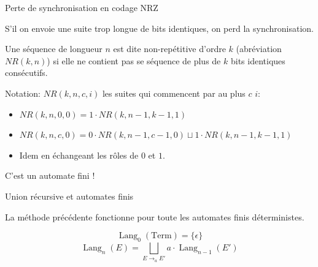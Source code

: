 \documentclass{beamer}
\begin{document}
\begin{frame}{Perte de synchronisation en codage NRZ}

  S'il on envoie une suite trop longue de bits identiques, on perd la
  synchronisation.
  \medskip

  \begin{definition}
    Une séquence de longueur $n$ est dite non-repétitive d'ordre $k$
    (abréviation $NR(k, n)$) si elle ne contient pas se séquence de plus de
    $k$ bits identiques consécutifs.
  \end{definition}
  Notation: $NR(k, n, c, i)$ les suites qui commencent par au plus $c$ $i$:
  \begin{itemize}
  \item $NR(k, n, 0, 0) = 1 \cdot NR(k, n-1, k-1, 1)$
  \item $NR(k, n, c, 0) = 0 \cdot NR(k, n-1, c-1, 0) \sqcup 
               1 \cdot NR(k, n-1, k-1, 1)$
             \item Idem en échangeant les rôles de $0$ et $1$.
  \end{itemize}
  \pause
  \LARGE C'est un automate fini !
\end{frame}

\begin{frame}{Union récursive et automates finis}

  \begin{NOTE}
    La méthode précédente fonctionne pour toute les automates finis
    déterministes.
  \end{NOTE}
  \[
  \operatorname{Lang}_0(\text{Term}) = \{\epsilon\}
  \]
  \[
  \operatorname{Lang}_n(E) = 
  \bigsqcup_{E\rightarrow_a E'} a\cdot \operatorname{Lang}_{n-1}(E')
  \]
\end{frame}
\end{document}
